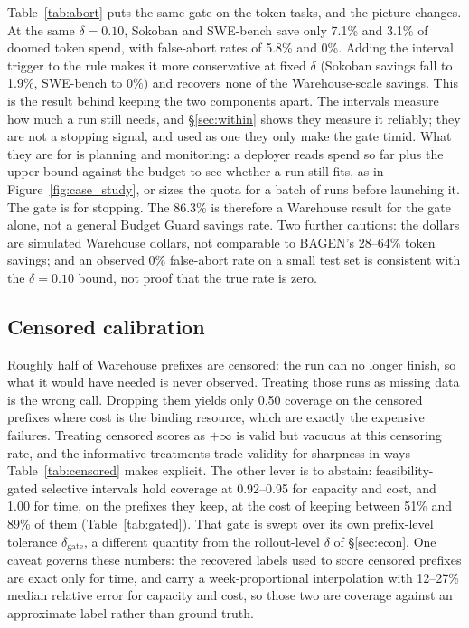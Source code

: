 \documentclass{article}
\begin{document}
Table~\ref{tab:abort} puts the same gate on the token tasks, and the picture changes. At the same $\delta{=}0.10$, Sokoban and SWE-bench save only 7.1\% and 3.1\% of doomed token spend, with false-abort rates of 5.8\% and 0\%. Adding the interval trigger to the rule makes it more conservative at fixed $\delta$ (Sokoban savings fall to 1.9\%, SWE-bench to 0\%) and recovers none of the Warehouse-scale savings. This is the result behind keeping the two components apart. The intervals measure how much a run still needs, and \S\ref{sec:within} shows they measure it reliably; they are not a stopping signal, and used as one they only make the gate timid. What they are for is planning and monitoring: a deployer reads spend so far plus the upper bound against the budget to see whether a run still fits, as in Figure~\ref{fig:case_study}, or sizes the quota for a batch of runs before launching it. The gate is for stopping. The 86.3\% is therefore a Warehouse result for the gate alone, not a general Budget Guard savings rate. Two further cautions: the dollars are simulated Warehouse dollars, not comparable to BAGEN's 28--64\% token savings; and an observed 0\% false-abort rate on a small test set is consistent with the $\delta{=}0.10$ bound, not proof that the true rate is zero.

\subsection{Censored calibration}
\label{sec:censored}

Roughly half of Warehouse prefixes are censored: the run can no longer finish, so what it would have needed is never observed. Treating those runs as missing data is the wrong call. Dropping them yields only 0.50 coverage on the censored prefixes where cost is the binding resource, which are exactly the expensive failures. Treating censored scores as $+\infty$ is valid but vacuous at this censoring rate, and the informative treatments trade validity for sharpness in ways Table~\ref{tab:censored} makes explicit. The other lever is to abstain: feasibility-gated selective intervals hold coverage at 0.92--0.95 for capacity and cost, and 1.00 for time, on the prefixes they keep, at the cost of keeping between 51\% and 89\% of them (Table~\ref{tab:gated}). That gate is swept over its own prefix-level tolerance $\delta_{\mathrm{gate}}$, a different quantity from the rollout-level $\delta$ of \S\ref{sec:econ}. One caveat governs these numbers: the recovered labels used to score censored prefixes are exact only for time, and carry a week-proportional interpolation with 12--27\% median relative error for capacity and cost, so those two are coverage against an approximate label rather than ground truth.
\end{document}
